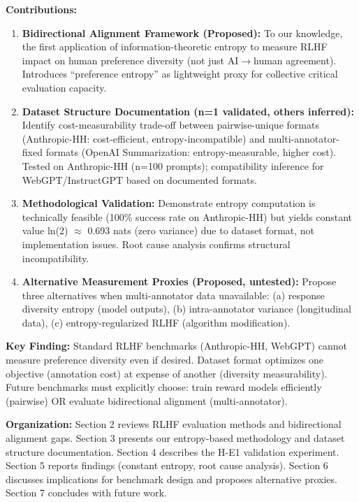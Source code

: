 \textbf{Contributions:}

\begin{enumerate}
\item \textbf{Bidirectional Alignment Framework (Proposed):} To our knowledge, the first application of information-theoretic entropy to measure RLHF impact on human preference diversity (not just AI$\rightarrow$human agreement). Introduces ``preference entropy'' as lightweight proxy for collective critical evaluation capacity.

\item \textbf{Dataset Structure Documentation (n=1 validated, others inferred):} Identify cost-measurability trade-off between pairwise-unique formats (Anthropic-HH: cost-efficient, entropy-incompatible) and multi-annotator-fixed formats (OpenAI Summarization: entropy-measurable, higher cost). Tested on Anthropic-HH (n=100 prompts); compatibility inference for WebGPT/InstructGPT based on documented formats.

\item \textbf{Methodological Validation:} Demonstrate entropy computation is technically feasible (100\% success rate on Anthropic-HH) but yields constant value ln(2) $\approx$ 0.693 nats (zero variance) due to dataset format, not implementation issues. Root cause analysis confirms structural incompatibility.

\item \textbf{Alternative Measurement Proxies (Proposed, untested):} Propose three alternatives when multi-annotator data unavailable: (a) response diversity entropy (model outputs), (b) intra-annotator variance (longitudinal data), (c) entropy-regularized RLHF (algorithm modification).
\end{enumerate}

\textbf{Key Finding:} Standard RLHF benchmarks (Anthropic-HH, WebGPT) cannot measure preference diversity even if desired. Dataset format optimizes one objective (annotation cost) at expense of another (diversity measurability). Future benchmarks must explicitly choose: train reward models efficiently (pairwise) OR evaluate bidirectional alignment (multi-annotator).

\textbf{Organization:} Section 2 reviews RLHF evaluation methods and bidirectional alignment gaps. Section 3 presents our entropy-based methodology and dataset structure documentation. Section 4 describes the H-E1 validation experiment. Section 5 reports findings (constant entropy, root cause analysis). Section 6 discusses implications for benchmark design and proposes alternative proxies. Section 7 concludes with future work.
